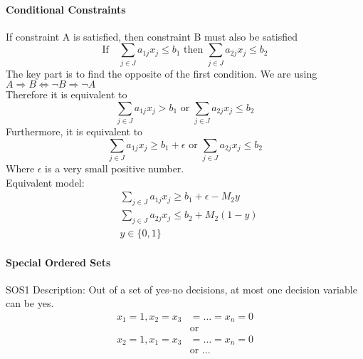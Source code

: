         \paragraph{Conditional Constraints}
             If constraint A is satisfied, then constraint B must also be satisfied
            \begin{equation*}
                \text{If} \quad \sum_{j\in J} a_{1j} x_j \le b_1 \text{ then } \sum_{j\in J} a_{2j} x_j \le b_2 
            \end{equation*}
            The key part is to find the opposite of the first condition. We are using $A\Rightarrow B \Leftrightarrow \neg B \Rightarrow \neg A$\\
            Therefore it is equivalent to
            \begin{equation*}
                \sum_{j\in J} a_{1j} x_j > b_1 \text{ or } \sum_{j\in J} a_{2j} x_j \le b_2 
            \end{equation*}
            Furthermore, it is equivalent to
            \begin{equation*}
                \sum_{j\in J} a_{1j} x_j \ge b_1 + \epsilon \text{ or } \sum_{j\in J} a_{2j} x_j \le b_2 
            \end{equation*}
            Where $\epsilon$ is a very small positive number.\\
            
            Equivalent model:
            \begin{align*}
                & \sum_{j\in J} a_{1j} x_j \ge b_1 + \epsilon -  M_2y  \\
                & \sum_{j\in J} a_{2j} x_j \le b_2 + M_2(1-y)  \\
                & y \in \{0, 1\} 
            \end{align*} 
        
        \paragraph{Special Ordered Sets}
            SOS1 Description: Out of a set of yes-no decisions, at most one decision variable can be yes. \
            \begin{align*}
                x_1=1,x_2=x_3&=\dots=x_n=0  \\
                &\text{or}  \\
                x_2=1, x_1=x_3&=\dots=x_n=0  \\
                &\text{or ...} 
            \end{align*} 
            
